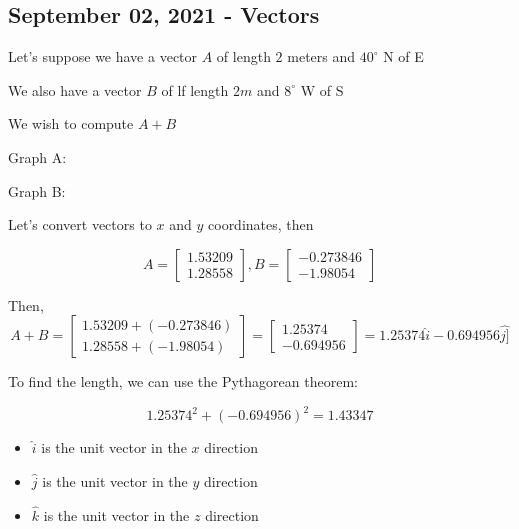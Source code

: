 \documentclass[../main.tex]{subfiles}
\begin{document}
\subsection{September 02, 2021 - Vectors}

\begin{remark}
Let's suppose we have a vector $A$ of length $2$ meters and $40^{\circ}$ N of E

We also have a vector $B$ of lf length $2m$ and $8^\circ$ W of S

We wish to compute $A + B$

Graph A:


Graph B:


Let's convert vectors to $x$ and $y$ coordinates, then

$$A = \begin{bmatrix}1.53209\\1.28558\end{bmatrix},
  B = \begin{bmatrix}-0.273846\\-1.98054\end{bmatrix}$$

Then, $$A + B = \begin{bmatrix}1.53209+(-0.273846)\\1.28558+(-1.98054)\end{bmatrix}
              = \begin{bmatrix}1.25374\\-0.694956\end{bmatrix}
              = 1.25374\hat{i} - 0.694956\hat{j]}$$

To find the length, we can use the Pythagorean theorem:

$$1.25374^2 + (-0.694956)^2 = 1.43347$$

\end{remark}

\begin{definition}
  \begin{itemize}
    \item $\hat{i}$ is the unit vector in the $x$ direction
    \item $\hat{j}$ is the unit vector in the $y$ direction
    \item $\hat{k}$ is the unit vector in the $z$ direction
  \end{itemize}
\end{definition}
\end{document}
